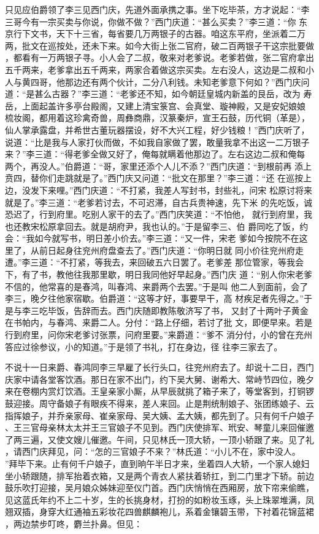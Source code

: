 只见应伯爵领了李三见西门庆，先道外面承携之事。坐下吃毕茶，方才说起：“李
三哥今有一宗买卖与你说，你做不做？”西门庆道：“甚么买卖？”李三道：“你
东京行下文书，天下十三省，每省要几万两银子的古器。咱这东平府，坐派着二万
两，批文在巡按处，还未下来。如今大街上张二官府，破二百两银子干这宗批要做
，都看有一万两银子寻。小人会了二叔，敬来对老爹说。老爹若做，张二官府拿出
五千两来，老爹拿出五千两来，两家合着做这宗买卖。左右没人，这边是二叔和小
人与黄四哥，他那边还有两个伙计，二分八利钱。未知老爹意下何如？”西门庆问
道：“是甚么古器？”李三道：“老爹还不知，如今朝廷皇城内新盖的艮岳，改为
寿岳，上面起盖许多亭台殿阁，又建上清宝箓宫、会真堂、璇神殿，又是安妃娘娘
梳妆阁，都用着这珍禽奇兽，周彝商鼎，汉篆秦炉，宣王石鼓，历代铜（革是），
仙人掌承露盘，并希世古董玩器摆设，好不大兴工程，好少钱粮！”西门庆听了，
说道：“比是我与人家打伙而做，不如我自家做了罢，敢量我拿不出这一二万银子
来？”李三道：“得老爹全做又好了，俺每就瞒着他那边了。左右这边二叔和俺每
两个，再没人。”伯爵道：“哥，家里还添个人儿不添？”西门庆道：“到根前再
添上贲四，替你们走跳就是了。”西门庆又问道：“批文在那里？”李三道：“还
在巡按上边，没发下来哩。”西门庆道：“不打紧，我差人写封书，封些礼，问宋
松原讨将来就是了。”李三道：“老爹若讨去，不可迟滞，自古兵贵神速，先下米
的先吃饭，诚恐迟了，行到府里。吃别人家干的去了。”西门庆笑道：“不怕他，
就行到府里，我也还教宋松原拿回去。就是胡府尹，我也认的。”于是留李三、伯
爵同吃了饭，约会：“我如今就写书，明日差小价去。”李三道：“又一件，宋老
爹如今按院不在这里了，从前日起身往兖州府盘查去了。”西门庆道：“你明日就
同小价往兖州府走遭。”李三道：“不打紧，等我去，来回破五六日罢了。老爹差
那位管家，等我会下，有了书，教他往我那里歇，明日我同他好早起身。”西门庆
道：“别人你宋老爹不信的，他常喜的是春鸿，叫春鸿、来爵两个去罢。”于是叫
他二人到面前，会了李三，晚夕往他家宿歇。伯爵道：“这等才好，事要早干，高
材疾足者先得之。”于是与李三吃毕饭，告辞而去。西门庆随即教陈敬济写了书，
又封了十两叶子黄金在书帕内，与春鸿、来爵二人。分付：“路上仔细，若讨了批
文，即便早来。若是行到府里，问你宋老爹讨张票，问府里要。”来爵道：“爹不
消分付，小的曾在充州答应过徐参议，小的知道。”于是领了书礼，打在身边，径
往李三家去了。

不说十一日来爵、春鸿同李三早雇了长行头口，往兖州府去了。却说十二日，西门
庆家中请各堂客饮酒。那日在家不出门，约下吴大舅、谢希大、常峙节四位，晚夕
来在卷棚内赏灯饮酒。王皇亲家小厮，从早辰就挑了箱子来了，等堂客到，打铜锣
鼓迎接。周守备娘子有眼疾不得来，差人来回。止是荆统制娘子、张团练娘子、云
指挥娘子，并乔亲家母、崔亲家母、吴大姨、孟大姨，都先到了。只有何千户娘子
、王三官母亲林太太并王三官娘子不见到。西门庆使排军、玳安、琴童儿来回催邀
了两三遍，又使文嫂儿催邀。午间，只见林氏一顶大轿，一顶小轿跟了来。见了礼
，请西门庆拜见，问：“怎的三官娘子不来？”林氏道：“小儿不在，家中没人。
”拜毕下来。止有何千户娘子，直到晌午半日才来，坐着四人大轿，一个家人媳妇
坐小轿跟随，排军抬着衣箱，又是两个青衣人紧扶着轿扛，到二门里才下轿。前边
鼓乐吹打迎接，吴月娘众姊妹迎至仪门首。西门庆悄悄在西厢房，放下帘来偷瞧，
见这蓝氏年约不上二十岁，生的长挑身材，打扮的如粉妆玉琢，头上珠翠堆满，凤
翘双插，身穿大红通袖五彩妆花四兽麒麟袍儿，系着金镶碧玉带，下衬着花锦蓝裙
，两边禁步叮咚，麝兰扑鼻。但见：

